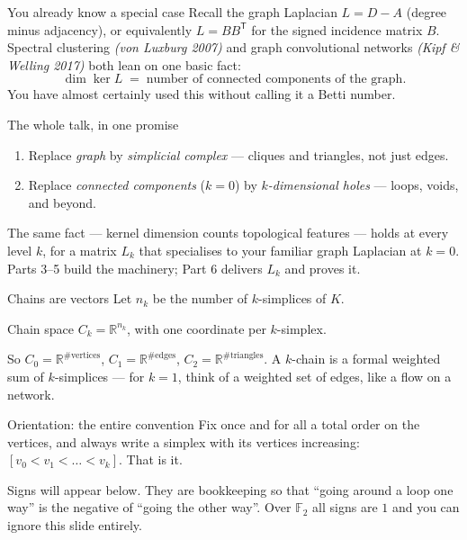 \documentclass[10pt,aspectratio=169]{beamer}
\newcommand{\R}{\mathbb{R}}
\newcommand{\bF}{\mathbb{F}}
\newcommand{\HL}[1]{\textcolor{blue!70!black}{#1}}
\begin{document}
    \begin{frame}[shrink=5]{You already know a special case}
        Recall the graph Laplacian $L=D-A$ (degree minus adjacency), or equivalently
        $L=BB^{\mathsf T}$ for the signed incidence matrix $B$. Spectral clustering
        \emph{(von Luxburg 2007)} and graph convolutional networks
        \emph{(Kipf \& Welling 2017)} both lean on one basic fact:
        \[
            \dim\ker L \;=\; \text{number of connected components of the graph.}
        \]
        You have almost certainly used this without calling it a Betti number.

        \vspace{0.7em}
        \begin{alertblock}{The whole talk, in one promise}
            \begin{enumerate}
                \item Replace \emph{graph} by \emph{simplicial complex} --- cliques and triangles,
                not just edges.
                \item Replace \emph{connected components} ($k=0$) by \emph{$k$-dimensional holes}
                --- loops, voids, and beyond.
            \end{enumerate}
            The same fact --- kernel dimension counts topological features --- holds at every
            level $k$, for a matrix $L_k$ that specialises to your familiar graph Laplacian at
            $k=0$. Parts 3--5 build the machinery; \HL{Part 6 delivers $L_k$ and proves it.}
        \end{alertblock}
    \end{frame}

    \begin{frame}{Chains are vectors}
        Let $n_k$ be the number of $k$-simplices of $K$.

        \begin{block}{Chain space}
            $C_k = \R^{n_k}$, with one coordinate per $k$-simplex.
        \end{block}

        So $C_0=\R^{\#\text{vertices}}$, $C_1=\R^{\#\text{edges}}$, $C_2=\R^{\#\text{triangles}}$.
        A \HL{$k$-chain} is a formal weighted sum of $k$-simplices --- for $k=1$, think of a
        weighted set of edges, like a flow on a network.

        \vspace{0.7em}
        \begin{block}{Orientation: the entire convention}
            Fix once and for all a total order on the vertices, and always write a simplex with
            its vertices increasing: $[v_0<v_1<\dots<v_k]$. That is it.
        \end{block}
        Signs will appear below. They are bookkeeping so that ``going around a loop
        one way'' is the negative of ``going the other way''.
        \HL{Over $\bF_2$ all signs are $1$ and you can ignore this slide entirely.}
    \end{frame}
\end{document}
